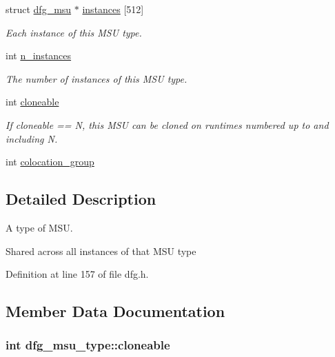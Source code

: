 \begin{DoxyCompactItemize}
struct \hyperlink{structdfg__msu}{dfg\-\_\-msu} $\ast$ \hyperlink{structdfg__msu__type_aac780324344ec376a3dc3d18704ca7c6}{instances} \mbox{[}512\mbox{]}
\begin{DoxyCompactList}\small\item\em Each instance of this M\-S\-U type. \end{DoxyCompactList}\item 
int \hyperlink{structdfg__msu__type_ae98668b711040cd8cb5d537bb9a3f0cd}{n\-\_\-instances}
\begin{DoxyCompactList}\small\item\em The number of instances of this M\-S\-U type. \end{DoxyCompactList}\item 
int \hyperlink{structdfg__msu__type_a21fd4fb5929221c5420e32f54507b33c}{cloneable}
\begin{DoxyCompactList}\small\item\em If cloneable == N, this M\-S\-U can be cloned on runtimes numbered up to and including N. \end{DoxyCompactList}\item 
int \hyperlink{structdfg__msu__type_ac40772c8600420c05ee16ff9ea527c95}{colocation\-\_\-group}
\end{DoxyCompactItemize}


\subsection{Detailed Description}
A type of M\-S\-U. 

Shared across all instances of that M\-S\-U type 

Definition at line 157 of file dfg.\-h.



\subsection{Member Data Documentation}
\hypertarget{structdfg__msu__type_a21fd4fb5929221c5420e32f54507b33c}{
\subsubsection[{cloneable}]{\setlength{\rightskip}{0pt plus 5cm}int dfg\-\_\-msu\-\_\-type\-::cloneable}}\label{structdfg__msu__type_a21fd4fb5929221c5420e32f54507b33c}


